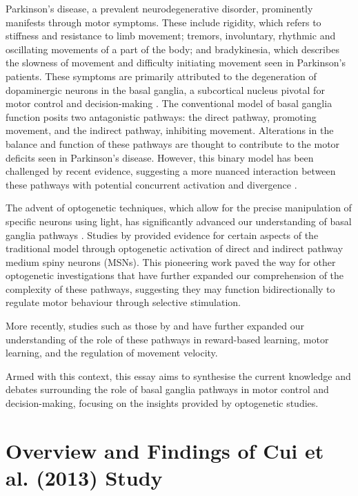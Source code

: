 \documentclass[10pt]{article}
\begin{document}
\begin{sloppypar}
  Parkinson’s disease, a prevalent neurodegenerative disorder, prominently manifests through motor symptoms. These include rigidity, which refers to stiffness and resistance to limb movement; tremors, involuntary, rhythmic and oscillating movements of a part of the body; and bradykinesia, which describes the slowness of movement and difficulty initiating movement seen in Parkinson’s patients. These symptoms are primarily attributed to the degeneration of dopaminergic neurons in the basal ganglia, a subcortical nucleus pivotal for motor control and decision-making \citep{kravitz_regulation_2010}. The conventional model of basal ganglia function posits two antagonistic pathways: the direct pathway, promoting movement, and the indirect pathway, inhibiting movement. Alterations in the balance and function of these pathways are thought to contribute to the motor deficits seen in Parkinson’s disease. However, this binary model has been challenged by recent evidence, suggesting a more nuanced interaction between these pathways with potential concurrent activation and divergence \citep{dunovan_believer-skeptic_2016}.

  The advent of optogenetic techniques, which allow for the precise manipulation of specific neurons using light, has significantly advanced our understanding of basal ganglia pathways \citep{kravitz_regulation_2010, cui_concurrent_2013}. Studies by \cite{kravitz_regulation_2010} provided evidence for certain aspects of the traditional model through optogenetic activation of direct and indirect pathway medium spiny neurons (MSNs). This pioneering work paved the way for other optogenetic investigations that have further expanded our comprehension of the complexity of these pathways, suggesting they may function bidirectionally \citep{yttri_opponent_2016} to regulate motor behaviour through selective stimulation.

  More recently, studies such as those by \cite{hilt_evidence_2016} and \cite{wang_direct_2015} have further expanded our understanding of the role of these pathways in reward-based learning, motor learning, and the regulation of movement velocity.

  Armed with this context, this essay aims to synthesise the current knowledge and debates surrounding the role of basal ganglia pathways in motor control and decision-making, focusing on the insights provided by optogenetic studies.

  \section{Overview and Findings of Cui et al. (2013) Study}
  \label{sec:cui-et-al-2013}


\end{sloppypar}
\end{document}
